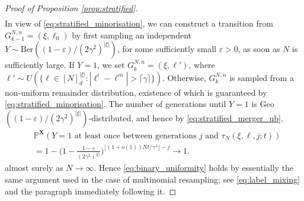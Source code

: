 \documentclass[a4paper,11pt]{article}
\theoremstyle{definition}
\newcommand{\bbP}{\mathbb{P}}
\newcommand{\bfX}{\mathbf{X}}
\begin{document}
\begin{proof}[Proof of Proposition \ref{prop:stratified}]
\begin{align}
\end{align}
In view of \eqref{eq:stratified_minorisation}, we can construct a transition from $G_{ k - 1 }^{ N, n } = ( \xi, \ell_0 )$ by first sampling an independent $Y \sim \text{Ber}( ( 1 - \varepsilon ) / ( 2 \gamma^2 )^{ | \xi | } )$, for some sufficiently small $\varepsilon > 0$, as soon as $N$ is sufficiently large.
If $Y = 1$, we set $G_k^{ N, n } = ( \xi, \ell' )$, where $\ell' \sim U( \{ \ell \in [ N ]_d^{ | \xi | } : | \ell^i - \ell^m | > \lceil \gamma \rceil \} )$.
Otherwise, $G_k^{ N, n }$ is sampled from a non-uniform remainder distribution, existence of which is guaranteed by \eqref{eq:stratified_minorisation}.
The number of generations until $Y = 1$ is Geo$( ( 1 - \varepsilon ) / ( 2 \gamma^2 )^{ | \xi | } )$-distributed, and hence by \eqref{eq:stratified_merger_ub},
\begin{align*}
&\bbP^{ \bfX }(Y = 1 \text{ at least once between generations } j \text { and } \tau_N( \xi, \ell, j; t ) ) \\
&= 1 - \Bigg(1 - \frac{ 1 - \varepsilon }{ ( 2 \gamma^2 )^{ | \xi | } } \Bigg)^{ \lfloor (1 + o(1)) N t / \gamma^4 \rfloor - j } \to 1.
\end{align*}
almost surely as $N \to \infty$.
Hence \eqref{eq:binary_uniformity} holds by essentially the same argument used in the case of multinomial resampling; see \eqref{eq:label_mixing} and the paragraph immediately following it.


\end{proof}
\end{document}
